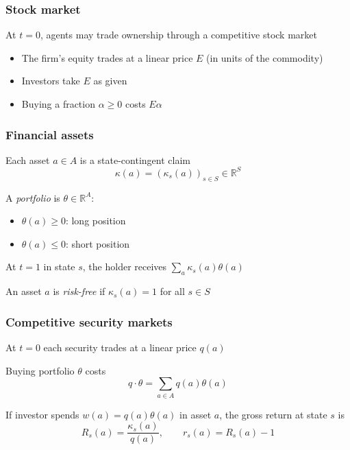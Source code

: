 \documentclass[blue]{beamer}
\def\R{\mathbb{R}}
\def\leq{\leqslant}
\def\geq{\geqslant}
\theoremstyle{definition}
\theoremstyle{example}
\begin{document}
\begin{frame}\frametitle{Stock market}
At $t=0$, agents may trade ownership through a competitive stock market
\bigskip

\begin{itemize}
\item The firm's equity trades at a linear price $E$ (in units of the commodity)
\item Investors take $E$ as given
\item Buying a fraction $\alpha \geq 0$ costs $E\alpha$
\end{itemize}
\end{frame}

\begin{frame}\frametitle{Financial assets}
Each asset $a \in A$ is a state-contingent claim
\begin{equation*}
\kappa(a) = (\kappa_s(a))_{s \in S} \in \R^S
\end{equation*}
\bigskip

A \emph{portfolio} is $\theta \in \R^A$:
\begin{itemize}
\item $\theta(a) \geq 0$: long position
\item $\theta(a) \leq 0$: short position
\end{itemize}
\bigskip

At $t=1$ in state $s$, the holder receives $\sum_a \kappa_s(a)\theta(a)$
\bigskip

An asset $a$ is \emph{risk-free} if $\kappa_s(a) = 1$ for all $s \in S$
\end{frame}

\begin{frame}\frametitle{Competitive security markets}
At $t=0$ each security trades at a linear price $q(a)$
\bigskip

Buying portfolio $\theta$ costs
\begin{equation*}
q \cdot \theta = \sum_{a \in A} q(a)\theta(a)
\end{equation*}
\bigskip

If investor spends $w(a) = q(a)\theta(a)$ in asset $a$, the gross return at state $s$ is
\begin{equation*}
R_s(a) = \frac{\kappa_s(a)}{q(a)},
\qquad
r_s(a) = R_s(a) - 1
\end{equation*}
\end{frame}
\end{document}
